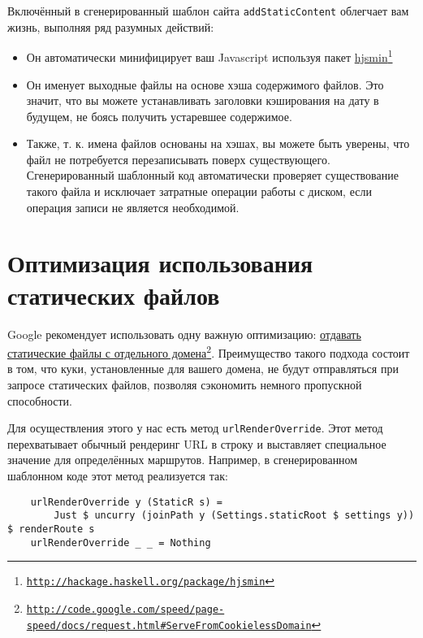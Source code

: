 Включённый в сгенерированный шаблон сайта \lstinline!addStaticContent! облегчает вам жизнь, выполняя ряд разумных действий:
\begin{itemize}
  \item Он автоматически минифицирует ваш Javascript используя пакет \href{http://hackage.haskell.org/package/hjsmin}{hjsmin}\footnote{\href{http://hackage.haskell.org/package/hjsmin}{\texttt{http://hackage.haskell.org/package/hjsmin}}}
  \item Он именует выходные файлы на основе хэша содержимого файлов. Это значит, что вы можете устанавливать заголовки кэширования на дату в будущем, не боясь получить устаревшее содержимое.
  \item Также, т. к. имена файлов основаны на хэшах, вы можете быть уверены, что файл не потребуется перезаписывать поверх существующего. Сгенерированный шаблонный код автоматически проверяет существование такого файла и исключает затратные операции работы с диском, если операция записи не является необходимой.
\end{itemize}

\section {Оптимизация использования статических файлов}

Google рекомендует использовать одну важную оптимизацию: \href{http://code.google.com/speed/page-speed/docs/request.html\#ServeFromCookielessDomain}{отдавать статические файлы с отдельного домена}\footnote{\href{http://code.google.com/speed/page-speed/docs/request.html\#ServeFromCookielessDomain}{\texttt{http://code.google.com/speed/page-speed/docs/request.html\#ServeFromCookielessDomain}}}. Преимущество такого подхода состоит в том, что куки, установленные для вашего домена, не будут отправляться при запросе статических файлов, позволяя сэкономить немного пропускной способности.

Для осуществления этого у нас есть метод \lstinline!urlRenderOverride!. Этот метод перехватывает обычный рендеринг URL в строку и выставляет специальное значение для определённых маршрутов. Например, в сгенерированном шаблонном коде этот метод реализуется так:

\begin{lstlisting}
    urlRenderOverride y (StaticR s) =
        Just $ uncurry (joinPath y (Settings.staticRoot $ settings y)) $ renderRoute s
    urlRenderOverride _ _ = Nothing
\end{lstlisting}%

